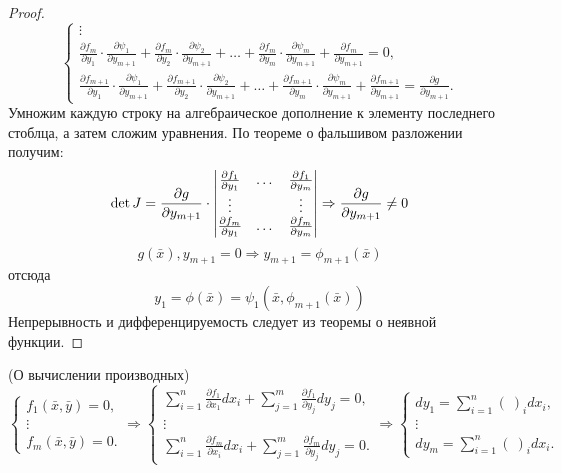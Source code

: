 \begin{proof}
\[\begin{cases}
        \vdots\\
        \frac{\partial {f_m}}{\partial {y_1}}\cdot \frac{\partial {\psi_1}}{\partial {y_{m+1}}}+\frac{\partial {f_m}}{\partial {y_2}}\cdot \frac{\partial {\psi_2}}{\partial {y_{m+1}}}+ \dots +\frac{\partial {f_m}}{\partial {y_m}}\cdot \frac{\partial {\psi_m}}{\partial {y_{m+1}}}+\frac{\partial {f_m}}{\partial {y_{m+1}}}=0,\\
        \frac{\partial {f_{m+1}}}{\partial {y_1}}\cdot \frac{\partial {\psi_1}}{\partial {y_{m+1}}}+\frac{\partial {f_{m+1}}}{\partial {y_2}}\cdot \frac{\partial {\psi_2}}{\partial {y_{m+1}}}+ \dots +\frac{\partial {f_{m+1}}}{\partial {y_m}}\cdot \frac{\partial {\psi_m}}{\partial {y_{m+1}}}+\frac{\partial {f_{m+1}}}{\partial {y_{m+1}}}=\frac{\partial {g}}{\partial {y_{m+1}}}.
    \end{cases}
    \]
    Умножим каждую строку на алгебраическое дополнение к элементу последнего стоблца, а затем сложим уравнения. По теореме о фальшивом разложении получим:
    \[\det{J}=\frac{\partial {g}}{\partial {y_{m+1}}}\cdot \begin{vmatrix}
        \frac{\partial {f_1}}{\partial {y_1}} & \dots & \frac{\partial {f_1}}{\partial {y_m}}\\
        \vdots & \null & \vdots\\
        \frac{\partial {f_m}}{\partial {y_1}} & \dots & \frac{\partial {f_m}}{\partial {y_m}}
    \end{vmatrix} \Rightarrow \frac{\partial {g}}{\partial {y_{m+1}}}\ne 0
    \]
    \[g(\bar{x}), y_{m+1}=0 \Rightarrow y_{m+1}=\phi_{m+1}(\bar{x})\]
    отсюда
    \[y_1=\phi(\bar{x})=\psi_1(\bar{x}, \phi_{m+1}(\bar{x}))\]
    Непрерывность и дифференцируемость следует из теоремы о неявной функции.
\end{proof} 
\begin{comm} (О вычислении производных)\\
    \[\begin{cases}
        f_1(\bar{x}, \bar{y})=0,\\
        \vdots\\
        f_m(\bar{x}, \bar{y})=0.
    \end{cases}
    \Rightarrow
    \begin{cases}
        \sum\limits_{i=1}^{n}\frac{\partial {f_1}}{\partial {x_1}}dx_i+\sum\limits_{j=1}^{m}\frac{\partial {f_1}}{\partial {y_j}}dy_j=0,\\
        \vdots\\
        \sum\limits_{i=1}^{n}\frac{\partial {f_m}}{\partial {x_i}}dx_i+\sum\limits_{j=1}^{m}\frac{\partial {f_m}}{\partial {y_j}}dy_j=0.
    \end{cases}
    \Rightarrow
    \begin{cases}
        dy_1=\sum\limits_{i=1}^{n}(\ )_i dx_i,\\
        \vdots\\
        dy_m=\sum\limits_{i=1}^{n}(\ )_i dx_i.
    \end{cases}
    \]
\end{comm} 
